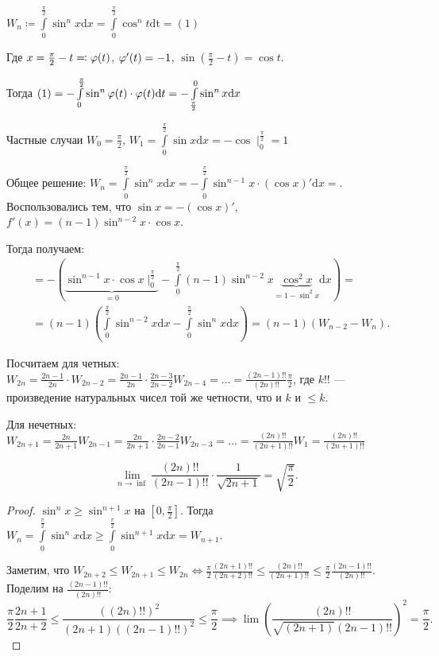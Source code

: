 \begin{example}
    $W_n \coloneqq \int\limits_0^{\frac{\pi}{2}} \sin^n x \mathrm{d}x = \int\limits_0^{\frac{\pi}{2}}\cos^n t \mathrm{dt} = (1)$

    Где $x = \frac{\pi}{2} - t \eqqcolon \varphi(t)$, $\varphi'(t) = -1$,  $\sin(\frac{\pi}{2} - t) = \cos t$. 

    Тогда $(1) = -\int\limits_0^{\frac{\pi}{2}}\sin^n \varphi(t) \cdot \varphi(t) \mathrm{d}t = -\int\limits_{\frac{\pi}{2}}^0 \sin^n x \mathrm{d}x$

    Частные случаи $W_0 = \frac{\pi}{2}$, $W_1 = \int\limits_0^{\frac{\pi}{2}} \sin x \mathrm{d}x = -\cos \mid_0^{\frac{\pi}{2}} = 1$

    Общее решение: $W_n = \int\limits_0^{\frac{\pi}{2}} \sin^n x \mathrm{d}x = -\int\limits_0^{\frac{\pi}{2}} \sin^{n-1}x \cdot (\cos x)' \mathrm{d}x = $. Воспользовались тем, что $\sin x = -(\cos x)'$, $f'(x) = (n-1)\sin^{n-2} x \cdot \cos x$. 

    Тогда получаем: \begin{align*} &= -\left(\underbrace{\sin^{n-1} x \cdot \cos x \mid_0^{\frac{\pi}{2}}}_{=0} - \int\limits_0^{\frac{\pi}{2}} (n-1)\sin^{n-2} x \underbrace{\cos^2 x}_{=1-\sin^2 x} \mathrm{d} x\right) = \\ & =(n-1)\left(\int\limits_{0}^{\frac{\pi}{2}} \sin^{n-2} x \mathrm{d}x - \int\limits_{0}^{\frac{\pi}{2}} \sin^n x \mathrm{d} x\right) = (n-1)(W_{n-2} - W_n).
    \end{align*}

    Посчитаем для четных: $W_{2n} = \frac{2n-1}{2n} \cdot W_{2n-2} = \frac{2n-1}{2n} \cdot \frac{2n-3}{2n - 2} W_{2n-4} = \ldots = \frac{(2n-1)!!}{(2n)!!} \frac{\pi}{2}$, где $k!!$  --- произведение натуральных чисел той же четности, что и  $k$ и  $\le k$.

    Для нечетных: $W_{2n + 1} = \frac{2n}{2n+1} W_{2n-1} = \frac{2n}{2n+1} \cdot \frac{2n-2}{2n-1}W_{2n-3} = \ldots = \frac{(2n)!!}{(2n+1)!!}W_1 = \frac{(2n)!!}{(2n+1)!!}$
\end{example}
\begin{theorem}
    \[
        \lim_{n\to \inf} \frac{(2n)!!}{(2n-1)!!} \cdot \frac{1}{\sqrt{2n+1}} = \sqrt{\frac{\pi}{2}}
    .\] 
\end{theorem}
\begin{proof}
    $\sin^n x \ge \sin^{n+1} x$ на $[0, \frac{\pi}{2}]$. Тогда $W_n = \int\limits_0^{\frac{\pi}{2}} \sin^n x \mathrm{d}x \ge \int\limits_0^{\frac{\pi}{2}} \sin^{n+1} x \mathrm{d}x = W_{n+1}$.

    Заметим, что $W_{2n+2} \le W_{2n+1} \le W_{2n} \iff \frac{\pi}{2}\frac{(2n+1)!!}{(2n+2)!!} \le \frac{(2n)!!}{(2n+1)!!} \le \frac{\pi}{2} \frac{(2n-1)!!}{(2n)!!}$. Поделим на $\frac{(2n-1)!!}{(2n)!!}$:  \[
        \frac{\pi}{2} \frac{2n+1}{2n+2} \le \frac{((2n)!!)^2}{(2n+1)((2n-1)!!)^2} \le \frac{\pi}{2} \implies \lim \left(\frac{(2n)!!}{\sqrt{(2n+1)}(2n-1)!!}\right)^2 = \frac{\pi}{2}
    .\] 
\end{proof}

